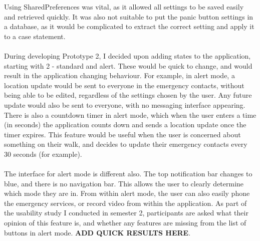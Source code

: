 \documentclass[a4paper]{report}
\begin{document}
Using SharedPreferences was vital, as it allowed all settings to be saved easily and retrieved quickly. It was also not suitable to put the panic button settings in a database, as it would be complicated to extract the correct setting and apply it to a case statement. \\\\
During developing Prototype 2, I decided upon adding states to the application, starting with 2 - standard and alert. These would be quick to change, and would result in the application changing behaviour. For example, in alert mode, a location update would be sent to everyone in the emergency contacts, without being able to be edited, regardless of the settings chosen by the user. Any future update would also be sent to everyone, with no messaging interface appearing. There is also a countdown timer in alert mode, which when the user enters a time (in seconds) the application counts down and sends a location update once the timer expires. This feature would be useful when the user is concerned about something on their walk, and decides to update their emergency contacts every 30 seconds (for example). \\\\
The interface for alert mode is different also. The top notification bar changes to blue, and there is no navigation bar. This allows the user to clearly determine which mode they are in. From within alert mode, the user can also easily phone the emergency services, or record video from within the application. As part of the usability study I conducted in semester 2, participants are asked what their opinion of this feature is, and whether any features are missing from the list of buttons in alert mode. \textbf{ADD QUICK RESULTS HERE}. \\
 
\end{document}

